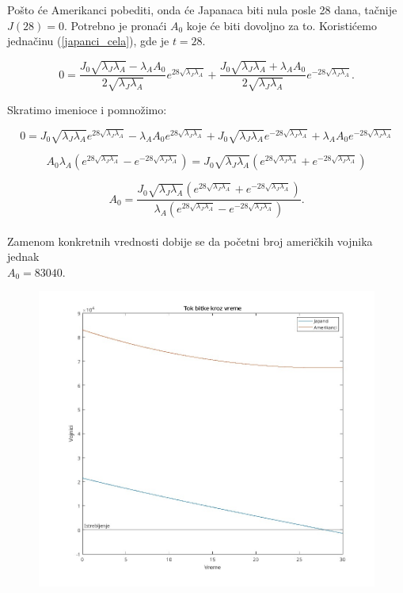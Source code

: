 \documentclass{article}
\newcommand{\laj}{\sqrt{\lambda_J\lambda_A}}
\begin{document}
\hspace{5mm}
Pošto će Amerikanci pobediti, onda će Japanaca biti nula posle 28 dana,
tačnije \(J(28) = 0\). Potrebno je pronaći \(A_0\) koje će biti dovoljno
za to. Koristićemo jednačinu (\ref{japanci_cela}), gde je \(t = 28\).

\[
0 = \frac{J_0 \laj - \lambda_A A_0}{2\laj} e^{28 \laj } +
    \frac{J_0 \laj + \lambda_A A_0}{2 \laj } e^{-28 \laj }.
\]

Skratimo imenioce i pomnožimo:

\[
  0 = J_0 \laj e^{28 \laj } - \lambda_A A_0 e^{28 \laj} +
  J_0 \laj e^{-28 \laj} + \lambda_A A_0 e^{-28 \laj}
\]

\[
  A_0 \lambda_A (e^{28 \laj} - e^{-28 \laj})
=
  J_0 \laj(e^{28 \laj} + e^{-28 \laj})
\]

\[
  A_0 =
  \frac{J_0 \laj(e^{28 \laj} + e^{-28 \laj})}
  {\lambda_A (e^{28 \laj} - e^{-28 \laj})}.
\]
\\
Zamenom konkretnih vrednosti dobije se da početni broj američkih vojnika
jednak \\ \(A_0 = 83040\). \\

\begin{figure}[htbp]
    \center
    \includegraphics[scale=0.35]{img/bitka28.jpg}
    
\end{figure}


\end{document}
